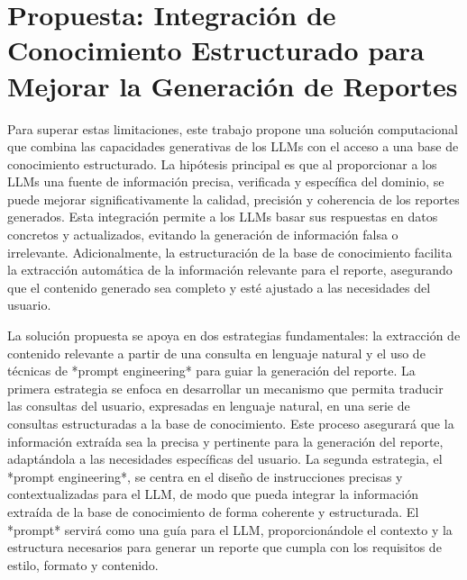 \section*{Propuesta: Integración de Conocimiento Estructurado para Mejorar la Generación de Reportes}

Para superar estas limitaciones, este trabajo propone una solución computacional que combina las capacidades generativas de los LLMs con el acceso a una base de conocimiento estructurado. La hipótesis principal es que al proporcionar a los LLMs una fuente de información precisa, verificada y específica del dominio, se puede mejorar significativamente la calidad, precisión y coherencia de los reportes generados. Esta integración permite a los LLMs basar sus respuestas en datos concretos y actualizados, evitando la generación de información falsa o irrelevante.  Adicionalmente, la estructuración de la base de conocimiento facilita la extracción automática de la información relevante para el reporte, asegurando que el contenido generado sea completo y esté ajustado a las necesidades del usuario.

La solución propuesta se apoya en dos estrategias fundamentales: la extracción de contenido relevante a partir de una consulta en lenguaje natural y el uso de técnicas de *prompt engineering* para guiar la generación del reporte. La primera estrategia se enfoca en desarrollar un mecanismo que permita traducir las consultas del usuario, expresadas en lenguaje natural, en una serie de consultas estructuradas a la base de conocimiento. Este proceso asegurará que la información extraída sea la precisa y pertinente para la generación del reporte, adaptándola a las necesidades específicas del usuario. La segunda estrategia, el *prompt engineering*, se centra en el diseño de instrucciones precisas y contextualizadas para el LLM, de modo que pueda integrar la información extraída de la base de conocimiento de forma coherente y estructurada. El *prompt* servirá como una guía para el LLM, proporcionándole el contexto y la estructura necesarios para generar un reporte que cumpla con los requisitos de estilo, formato y contenido.

